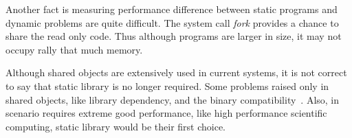 Another fact is measuring performance difference between static programs and
dynamic problems are quite difficult. The system call \emph{fork} provides a
chance to share the read only code. Thus although programs are larger in size,
it may not occupy rally that much memory. 

Although shared objects are extensively used in current systems, it is not
correct to say that static library is no longer required. Some problems 
raised only in shared objects, like library dependency, and the binary 
compatibility~\cite{dllhell}. Also, in scenario requires extreme good performance,
like high performance scientific computing, static library would be their
first choice. 
